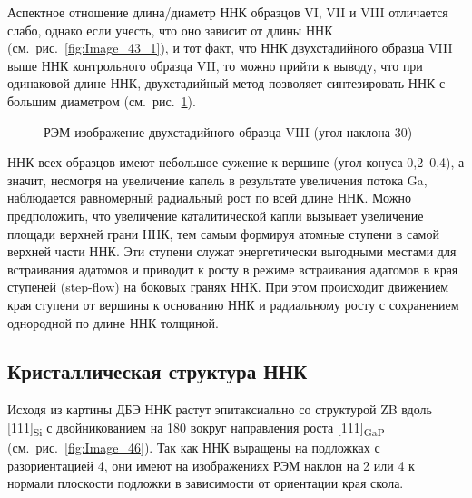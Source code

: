 Аспектное отношение длина/диаметр ННК образцов VI, VII и VIII отличается слабо,
однако если учесть, что оно зависит от длины ННК
(см.~рис.~\cref{fig:Image_43_1}), и тот факт, что ННК двухстадийного образца
VIII выше ННК контрольного образца VII, то можно прийти к выводу, что при
одинаковой длине ННК, двухстадийный метод позволяет синтезировать ННК с большим
диаметром (см.~рис.~\cref{fig:Image_45}).

\begin{figure}[ht]  \caption{РЭМ изображение
двухстадийного образца VIII (угол наклона 30{\textdegree})}\label{fig:Image_45}
\end{figure}

ННК всех образцов имеют небольшое сужение к вершине (угол конуса
0,2--0,4{\textdegree}), а значит, несмотря на увеличение капель в результате
увеличения потока Ga, наблюдается равномерный радиальный рост по всей длине
ННК. Можно предположить, что увеличение каталитической капли вызывает
увеличение площади верхней грани ННК, тем самым формируя атомные ступени в
самой верхней части ННК. Эти ступени служат энергетически выгодными местами для
встраивания адатомов и приводит к росту в режиме встраивания адатомов в края
ступеней (step-flow) на боковых гранях ННК. При этом происходит движением края
ступени от вершины к основанию ННК и радиальному росту с сохранением однородной
по длине ННК толщиной.

\subsection{Кристаллическая структура ННК}\label{subsec:ch6/sec2/sub6}

Исходя из картины ДБЭ ННК растут эпитаксиально со структурой ZB вдоль
[111]\textsubscript{Si} с двойникованием на 180{\textdegree} вокруг направления
роста [111]\textsubscript{GaP} (см.~рис.~\cref{fig:Image_46}). Так как ННК
выращены на подложках с разориентацией 4{\textdegree}, они имеют на
изображениях РЭМ наклон на 2{\textdegree} или 4{\textdegree} к нормали
плоскости подложки в зависимости от ориентации края скола.

